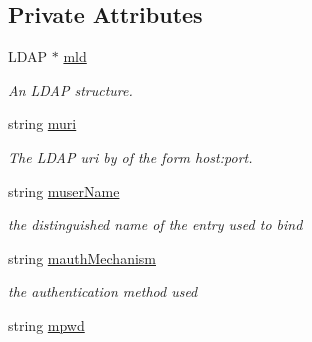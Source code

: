 \subsection*{Private Attributes}
\begin{DoxyCompactItemize}
\item 
\hypertarget{classLDAPProxy_ae6204275667aa75aed99574a2cf0d4ec}{
LDAP $\ast$ \hyperlink{classLDAPProxy_ae6204275667aa75aed99574a2cf0d4ec}{mld}}
\label{classLDAPProxy_ae6204275667aa75aed99574a2cf0d4ec}

\begin{DoxyCompactList}\small\item\em An LDAP structure. \item\end{DoxyCompactList}\item 
\hypertarget{classLDAPProxy_ae31fa74098173a509b3d3032d5a32271}{
string \hyperlink{classLDAPProxy_ae31fa74098173a509b3d3032d5a32271}{muri}}
\label{classLDAPProxy_ae31fa74098173a509b3d3032d5a32271}

\begin{DoxyCompactList}\small\item\em The LDAP uri by of the form host:port. \item\end{DoxyCompactList}\item 
\hypertarget{classLDAPProxy_a6cc190dd28d1b2e04659eb1741691941}{
string \hyperlink{classLDAPProxy_a6cc190dd28d1b2e04659eb1741691941}{muserName}}
\label{classLDAPProxy_a6cc190dd28d1b2e04659eb1741691941}

\begin{DoxyCompactList}\small\item\em the distinguished name of the entry used to bind \item\end{DoxyCompactList}\item 
\hypertarget{classLDAPProxy_ac59af93b311ce931874d45b647d85936}{
string \hyperlink{classLDAPProxy_ac59af93b311ce931874d45b647d85936}{mauthMechanism}}
\label{classLDAPProxy_ac59af93b311ce931874d45b647d85936}

\begin{DoxyCompactList}\small\item\em the authentication method used \item\end{DoxyCompactList}\item 
\hypertarget{classLDAPProxy_a04e84336aebbd032b1e88b3042f918a0}{
string \hyperlink{classLDAPProxy_a04e84336aebbd032b1e88b3042f918a0}{mpwd}}
\label{classLDAPProxy_a04e84336aebbd032b1e88b3042f918a0}


\end{DoxyCompactItemize}
